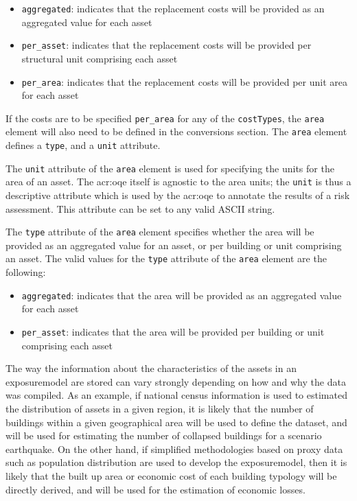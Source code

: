 \begin{itemize}

  \item \Verb+aggregated+: indicates that the replacement costs will be 
    provided as an aggregated value for each \gls{asset}

  \item \Verb+per_asset+: indicates that the replacement costs will be 
    provided per structural unit comprising each \gls{asset}

  \item \Verb+per_area+: indicates that the replacement costs will be 
    provided per unit area for each \gls{asset}

\end{itemize}

If the costs are to be specified \Verb+per_area+ for any of the
\Verb+costTypes+, the \Verb+area+ element will also need to be defined in the
conversions section. The \Verb+area+ element defines a \Verb+type+, and a
\Verb+unit+ attribute.

The \Verb+unit+ attribute of the \Verb+area+ element is used for specifying
the units for the area of an \gls{asset}. The \glsdesc{acr:oqe} itself is
agnostic to the area units; the \Verb+unit+ is thus a descriptive attribute
which is used by the \glsdesc{acr:oqe} to annotate the results of a risk
assessment. This attribute can be set to any valid ASCII string.

The \Verb+type+ attribute of the \Verb+area+ element specifies whether the
area will be provided as an aggregated value for an \gls{asset}, or per
building or unit comprising an \gls{asset}. The valid values for the
\Verb+type+ attribute of the \Verb+area+ element are the following:

\begin{itemize}

  \item \Verb+aggregated+: indicates that the area will be provided as an 
    aggregated value for each \gls{asset}

  \item \Verb+per_asset+: indicates that the area will be provided per 
    building or unit comprising each \gls{asset}

\end{itemize}


The way the information about the characteristics of the \glspl{asset} in an
\gls{exposuremodel} are stored can vary strongly depending on how and why the
data was compiled. As an example, if national census information is used to
estimated the distribution of \glspl{asset} in a given region, it is likely
that the number of buildings within a given geographical area will be used to
define the dataset, and will be used for estimating the number of collapsed
buildings for a scenario earthquake. On the other hand, if simplified
methodologies based on proxy data such as population distribution are used to
develop the \gls{exposuremodel}, then it is likely that the built up area or
economic cost of each building typology will be directly derived, and will be
used for the estimation of economic losses.


